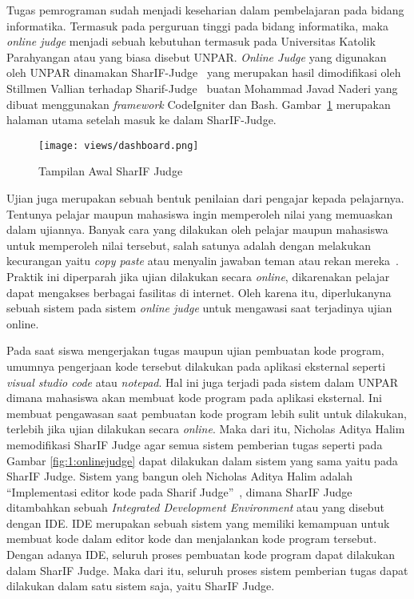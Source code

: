 Tugas pemrograman sudah menjadi keseharian dalam pembelajaran pada bidang informatika.
Termasuk pada perguruan tinggi pada bidang informatika, maka \textit{online judge} menjadi sebuah kebutuhan termasuk pada Universitas Katolik Parahyangan atau yang biasa disebut UNPAR.
\textit{Online Judge} yang digunakan oleh UNPAR dinamakan SharIF-Judge~\cite{stillmen:sharif} yang merupakan hasil dimodifikasi oleh Stillmen Vallian terhadap Sharif-Judge~\cite{javed:sharif} buatan Mohammad Javad Naderi yang dibuat menggunakan \textit{framework} CodeIgniter dan Bash. Gambar~\ref{fig:1:dashboardpng} merupakan halaman utama setelah masuk ke dalam SharIF-Judge.

\begin{figure}[H]
    \centering
    \texttt{[image: views/dashboard.png]}
    \caption[Tampilan Awal SharIF Judge]{Tampilan Awal SharIF Judge}
    \label{fig:1:dashboardpng}
\end{figure}

Ujian juga merupakan sebuah bentuk penilaian dari pengajar kepada pelajarnya. Tentunya pelajar maupun mahasiswa ingin memperoleh nilai yang memuaskan dalam ujiannya. Banyak cara yang dilakukan oleh pelajar maupun mahasiswa untuk memperoleh nilai tersebut, salah satunya adalah dengan melakukan kecurangan yaitu \textit{copy paste} atau menyalin jawaban teman atau rekan mereka~\cite{febriana:plagiarisme}. Praktik ini diperparah jika ujian dilakukan secara \textit{online}, dikarenakan pelajar dapat mengakses berbagai fasilitas di internet. Oleh karena itu, diperlukanyna sebuah sistem pada sistem \textit{online judge} untuk mengawasi saat terjadinya ujian online.

Pada saat siswa mengerjakan tugas maupun ujian pembuatan kode program, umumnya pengerjaan kode tersebut dilakukan pada aplikasi eksternal seperti \textit{visual studio code} atau \textit{notepad}. Hal ini juga terjadi pada sistem dalam UNPAR dimana mahasiswa akan membuat kode program pada aplikasi eksternal. Ini membuat pengawasan saat pembuatan kode program lebih sulit untuk dilakukan, terlebih jika ujian dilakukan secara \textit{online}. Maka dari itu, Nicholas Aditya Halim memodifikasi SharIF Judge agar semua sistem pemberian tugas seperti pada Gambar \ref{fig:1:onlinejudge} dapat dilakukan dalam sistem yang sama yaitu pada SharIF Judge. Sistem yang bangun oleh Nicholas Aditya Halim adalah ``Implementasi editor kode pada Sharif Judge''~\cite{nicholas:sharif}, dimana SharIF Judge ditambahkan sebuah \textit{Integrated Development Environment} atau yang disebut dengan IDE. IDE merupakan sebuah sistem yang memiliki kemampuan untuk membuat kode dalam editor kode dan menjalankan kode program tersebut. Dengan adanya IDE, seluruh proses pembuatan kode program dapat dilakukan dalam SharIF Judge. Maka dari itu, seluruh proses sistem pemberian tugas dapat dilakukan dalam satu sistem saja, yaitu SharIF Judge.

